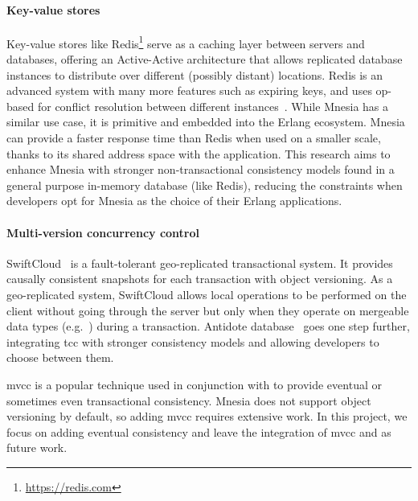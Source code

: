 \paragraph{Key-value stores}

Key-value stores like Redis\footnote{\url{https://redis.com}} serve as a caching 
layer between servers and databases, offering an Active-Active architecture that allows
replicated database instances to distribute over different (possibly distant) locations.
Redis is an advanced system with many more features such as expiring keys,
and uses op-based  for conflict resolution between different 
instances~\cite{redis2022rediscrdt}. While Mnesia has a similar use case, it is
primitive and embedded into the Erlang ecosystem. 
Mnesia can provide a faster response time than Redis when used on a smaller scale,
thanks to its shared address space with the application. This research aims
to enhance Mnesia with stronger non-transactional consistency models
found in a general purpose in-memory database (like Redis), reducing
the constraints when developers opt for Mnesia as the choice of their Erlang applications.


\paragraph{Multi-version concurrency control} \label{subsec:related mvcc}

SwiftCloud~\cite{preguica2014SwiftCloud} is a fault-tolerant geo-replicated 
transactional system. It provides causally
consistent snapshots for each transaction with object versioning. As a geo-replicated system, 
SwiftCloud allows local operations to be performed on the client without going
through the server but only when they operate on mergeable data 
types (e.g.\ ) during a transaction. Antidote database~\cite{shapiro2018Antidote} 
goes one step further, integrating \acrshort{tcc} with stronger consistency models and
allowing developers to choose between them.

\acrfull{mvcc} is a popular technique used in conjunction with
 to provide eventual or sometimes even transactional consistency.
Mnesia does not support object versioning by default, so
adding \acrshort{mvcc} requires extensive work. In this project, we focus
on adding eventual consistency and leave the integration of \acrshort{mvcc} and 
 as future work.


